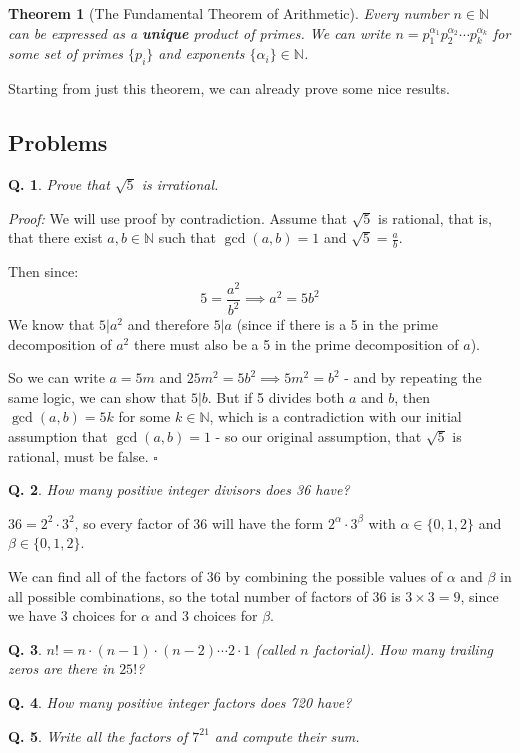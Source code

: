\documentclass{article}
\newtheorem{theorem}{Theorem}
\newtheorem{question}{Q.}
\begin{document}
\begin{theorem}[The Fundamental Theorem of Arithmetic]

Every number $n \in \mathbb{N}$ can be expressed as a \textbf{unique}
product of primes. We can write $n = p_1^{\alpha_1}p_2^{\alpha_2}\cdots p_k^{\alpha_k}$
for some set of primes $\{p_i\}$ and exponents $\{\alpha_i\} \in \mathbb{N}$.
\end{theorem}

Starting from just this theorem, we can already prove some nice results.

\subsection{Problems}

\begin{question}Prove that $\sqrt{5}$ is irrational.\end{question}

\emph{Proof:} We will use proof by contradiction. Assume that $\sqrt{5}$ is rational,
that is, that there exist $a,b\in \mathbb{N}$ such that $\gcd(a,b)=1$ and 
$\sqrt{5}=\frac{a}{b}$.

Then since:
\[ 5 = \frac{a^2}{b^2} \implies a^2=5b^2 \]
We know that $5 | a^2$ and therefore $5|a$ (since if there is a 5 in the prime
decomposition of $a^2$ there must also be a 5 in the prime decomposition of $a$).

So we can write $a=5m$ and $25m^2 = 5b^2 \implies 5m^2 = b^2$ - and by repeating the
same logic, we can show that $5 | b$. But if 5 divides both $a$ and $b$, then
$\gcd(a,b) = 5k$ for some $k \in \mathbb{N}$, which is a contradiction with our
initial assumption that $\gcd(a,b)=1$ - so our original assumption, that $\sqrt{5}$
is rational, must be false. 
$\square$

\begin{question}How many positive integer divisors does 36 have?\end{question}

$36 = 2^2 \cdot 3^2$, so every factor of 36 will have the form 
$2^{\alpha}\cdot 3^{\beta}$ with $\alpha \in \{0,1,2\}$ and $\beta \in \{0,1,2\}$.

We can find all of the factors of 36 by combining the possible values of $\alpha$
and $\beta$ in all possible combinations, so the total number of factors of 36 is 
$3 \times 3 = 9$, since we have 3 choices for $\alpha$ and 3 choices for $\beta$.


\begin{question} $n! = n\cdot (n-1)\cdot (n-2) \cdots 2 \cdot 1$ (called $n$
factorial). How many trailing zeros are there in $25!$?\end{question}
\vspace*{\bigskipamount}

\begin{question}How many positive integer factors does 720 have?\end{question}
\vspace*{\bigskipamount}

\begin{question}Write all the factors of $7^{21}$ and compute their sum.\end{question}
\vspace*{\bigskipamount}
\end{document}
